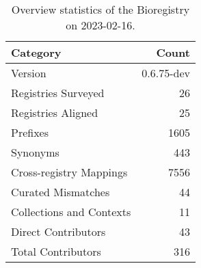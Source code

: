 \begin{table}
\centering
\caption{Overview statistics of the Bioregistry on 2023-02-16.}
\label{tab:bioregistry-summary}
\begin{tabular}{lr}
\toprule
                Category &      Count \\
\midrule
                 Version & 0.6.75-dev \\
     Registries Surveyed &         26 \\
      Registries Aligned &         25 \\
                Prefixes &       1605 \\
                Synonyms &        443 \\
 Cross-registry Mappings &       7556 \\
      Curated Mismatches &         44 \\
Collections and Contexts &         11 \\
     Direct Contributors &         43 \\
      Total Contributors &        316 \\
\bottomrule
\end{tabular}
\end{table}

